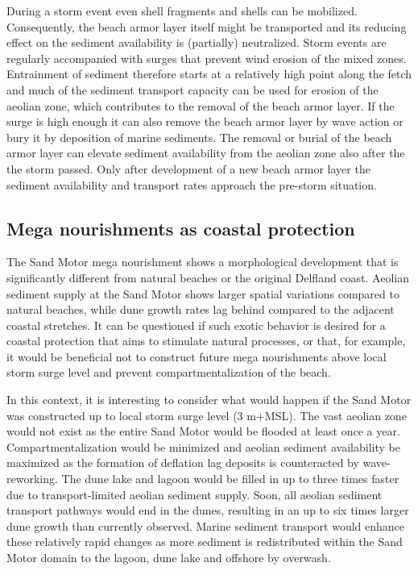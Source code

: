 During a storm event even shell fragments and shells can be
mobilized. Consequently, the beach armor layer itself might be
transported and its reducing effect on the sediment availability is
(partially) neutralized. Storm events are regularly accompanied with
surges that prevent wind erosion of the mixed zones. Entrainment of
sediment therefore starts at a relatively high point along the fetch
and much of the sediment transport capacity can be used for erosion of
the aeolian zone, which contributes to the removal of the beach armor
layer. If the surge is high enough it can also remove the beach armor
layer by wave action or bury it by deposition of marine sediments. The
removal or burial of the beach armor layer can elevate sediment
availability from the aeolian zone also after the the storm
passed. Only after development of a new beach armor layer the sediment
availability and transport rates approach the pre-storm
situation.

\subsection{Mega nourishments as coastal protection}

The Sand Motor mega nourishment shows a morphological development that
is significantly different from natural beaches or the original
Delfland coast. Aeolian sediment supply at the Sand Motor shows larger
spatial variations compared to natural beaches, while dune growth
rates lag behind compared to the adjacent coastal stretches. It can be
questioned if such exotic behavior is desired for a coastal protection
that aims to stimulate natural processes, or that, for example, it
would be beneficial not to construct future mega nourishments above
local storm surge level and prevent compartmentalization of the beach.

In this context, it is interesting to consider what would happen if
the Sand Motor was constructed up to local storm surge level (3
m+MSL). The vast aeolian zone would not exist as the entire Sand Motor
would be flooded at least once a year. Compartmentalization would be
minimized and aeolian sediment availability be maximized as the
formation of deflation lag deposits is counteracted by
wave-reworking. The dune lake and lagoon would be filled in up to
three times faster due to transport-limited aeolian sediment
supply. Soon, all aeolian sediment transport pathways would end in the
dunes, resulting in an up to six times larger dune growth than
currently observed. Marine sediment transport would enhance these
relatively rapid changes as more sediment is redistributed within the
Sand Motor domain to the lagoon, dune lake and offshore by overwash.

